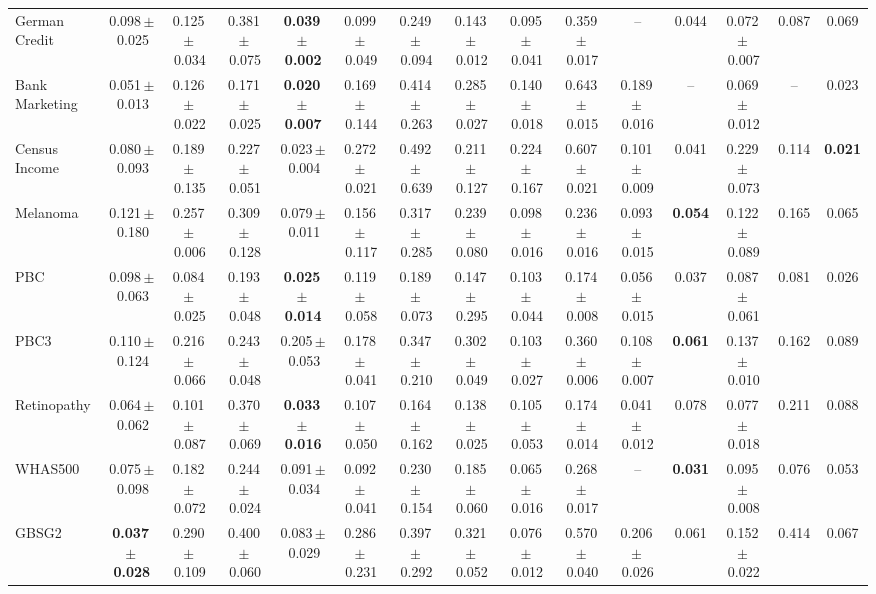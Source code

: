 \documentclass[8pt]{extarticle}
\begin{document}
\begin{longtable}{l*{14}{c}}
German Credit & 0.098\,$\pm$\,0.025 & 0.125\,$\pm$\,0.034 & 0.381\,$\pm$\,0.075 & \textbf{0.039\,$\pm$\,0.002} & 0.099\,$\pm$\,0.049 & 0.249\,$\pm$\,0.094 & 0.143\,$\pm$\,0.012 & 0.095\,$\pm$\,0.041 & 0.359\,$\pm$\,0.017 & -- & 0.044 & 0.072\,$\pm$\,0.007 & 0.087 & 0.069 \\
Bank Marketing & 0.051\,$\pm$\,0.013 & 0.126\,$\pm$\,0.022 & 0.171\,$\pm$\,0.025 & \textbf{0.020\,$\pm$\,0.007} & 0.169\,$\pm$\,0.144 & 0.414\,$\pm$\,0.263 & 0.285\,$\pm$\,0.027 & 0.140\,$\pm$\,0.018 & 0.643\,$\pm$\,0.015 & 0.189\,$\pm$\,0.016 & -- & 0.069\,$\pm$\,0.012 & -- & 0.023 \\
Census Income & 0.080\,$\pm$\,0.093 & 0.189\,$\pm$\,0.135 & 0.227\,$\pm$\,0.051 & 0.023\,$\pm$\,0.004 & 0.272\,$\pm$\,0.021 & 0.492\,$\pm$\,0.639 & 0.211\,$\pm$\,0.127 & 0.224\,$\pm$\,0.167 & 0.607\,$\pm$\,0.021 & 0.101\,$\pm$\,0.009 & 0.041 & 0.229\,$\pm$\,0.073 & 0.114 & \textbf{0.021} \\
Melanoma & 0.121\,$\pm$\,0.180 & 0.257\,$\pm$\,0.006 & 0.309\,$\pm$\,0.128 & 0.079\,$\pm$\,0.011 & 0.156\,$\pm$\,0.117 & 0.317\,$\pm$\,0.285 & 0.239\,$\pm$\,0.080 & 0.098\,$\pm$\,0.016 & 0.236\,$\pm$\,0.016 & 0.093\,$\pm$\,0.015 & \textbf{0.054} & 0.122\,$\pm$\,0.089 & 0.165 & 0.065 \\
PBC & 0.098\,$\pm$\,0.063 & 0.084\,$\pm$\,0.025 & 0.193\,$\pm$\,0.048 & \textbf{0.025\,$\pm$\,0.014} & 0.119\,$\pm$\,0.058 & 0.189\,$\pm$\,0.073 & 0.147\,$\pm$\,0.295 & 0.103\,$\pm$\,0.044 & 0.174\,$\pm$\,0.008 & 0.056\,$\pm$\,0.015 & 0.037 & 0.087\,$\pm$\,0.061 & 0.081 & 0.026 \\
PBC3 & 0.110\,$\pm$\,0.124 & 0.216\,$\pm$\,0.066 & 0.243\,$\pm$\,0.048 & 0.205\,$\pm$\,0.053 & 0.178\,$\pm$\,0.041 & 0.347\,$\pm$\,0.210 & 0.302\,$\pm$\,0.049 & 0.103\,$\pm$\,0.027 & 0.360\,$\pm$\,0.006 & 0.108\,$\pm$\,0.007 & \textbf{0.061} & 0.137\,$\pm$\,0.010 & 0.162 & 0.089 \\
Retinopathy & 0.064\,$\pm$\,0.062 & 0.101\,$\pm$\,0.087 & 0.370\,$\pm$\,0.069 & \textbf{0.033\,$\pm$\,0.016} & 0.107\,$\pm$\,0.050 & 0.164\,$\pm$\,0.162 & 0.138\,$\pm$\,0.025 & 0.105\,$\pm$\,0.053 & 0.174\,$\pm$\,0.014 & 0.041\,$\pm$\,0.012 & 0.078 & 0.077\,$\pm$\,0.018 & 0.211 & 0.088 \\
WHAS500 & 0.075\,$\pm$\,0.098 & 0.182\,$\pm$\,0.072 & 0.244\,$\pm$\,0.024 & 0.091\,$\pm$\,0.034 & 0.092\,$\pm$\,0.041 & 0.230\,$\pm$\,0.154 & 0.185\,$\pm$\,0.060 & 0.065\,$\pm$\,0.016 & 0.268\,$\pm$\,0.017 & -- & \textbf{0.031} & 0.095\,$\pm$\,0.008 & 0.076 & 0.053 \\
GBSG2 & \textbf{0.037\,$\pm$\,0.028} & 0.290\,$\pm$\,0.109 & 0.400\,$\pm$\,0.060 & 0.083\,$\pm$\,0.029 & 0.286\,$\pm$\,0.231 & 0.397\,$\pm$\,0.292 & 0.321\,$\pm$\,0.052 & 0.076\,$\pm$\,0.012 & 0.570\,$\pm$\,0.040 & 0.206\,$\pm$\,0.026 & 0.061 & 0.152\,$\pm$\,0.022 & 0.414 & 0.067 \\

\end{longtable}
\end{document}
